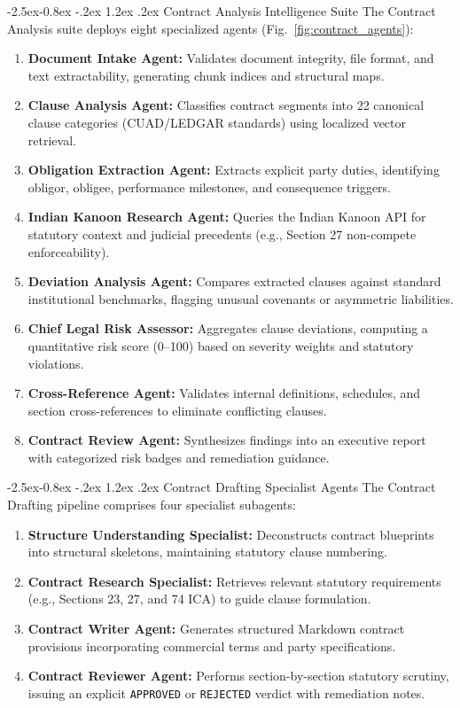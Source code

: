 \documentclass[3p,times,procedia]{elsarticle}
\makeatletter
\renewcommand\subsection{\@startsection{subsection}{2}{\z@}%
                                     {-2.5ex\@plus -0.8ex \@minus -.2ex}%
                                     {1.2ex \@plus .2ex}%
                                     {\fontsize{10}{12}\selectfont\itshape}}
\makeatother
\begin{document}
\subsection{Contract Analysis Intelligence Suite}
The Contract Analysis suite deploys eight specialized agents (Fig.~\ref{fig:contract_agents}):
\begin{enumerate}
\setlength{\itemsep}{0pt}\setlength{\parskip}{0pt}
\item \textbf{Document Intake Agent:} Validates document integrity, file format, and text extractability, generating chunk indices and structural maps.
\item \textbf{Clause Analysis Agent:} Classifies contract segments into 22 canonical clause categories (CUAD/LEDGAR standards) using localized vector retrieval.
\item \textbf{Obligation Extraction Agent:} Extracts explicit party duties, identifying obligor, obligee, performance milestones, and consequence triggers.
\item \textbf{Indian Kanoon Research Agent:} Queries the Indian Kanoon API for statutory context and judicial precedents (e.g., Section 27 non-compete enforceability).
\item \textbf{Deviation Analysis Agent:} Compares extracted clauses against standard institutional benchmarks, flagging unusual covenants or asymmetric liabilities.
\item \textbf{Chief Legal Risk Assessor:} Aggregates clause deviations, computing a quantitative risk score (0--100) based on severity weights and statutory violations.
\item \textbf{Cross-Reference Agent:} Validates internal definitions, schedules, and section cross-references to eliminate conflicting clauses.
\item \textbf{Contract Review Agent:} Synthesizes findings into an executive report with categorized risk badges and remediation guidance.
\end{enumerate}

\subsection{Contract Drafting Specialist Agents}
The Contract Drafting pipeline comprises four specialist subagents:
\begin{enumerate}
\setlength{\itemsep}{0pt}\setlength{\parskip}{0pt}
\item \textbf{Structure Understanding Specialist:} Deconstructs contract blueprints into structural skeletons, maintaining statutory clause numbering.
\item \textbf{Contract Research Specialist:} Retrieves relevant statutory requirements (e.g., Sections 23, 27, and 74 ICA) to guide clause formulation.
\item \textbf{Contract Writer Agent:} Generates structured Markdown contract provisions incorporating commercial terms and party specifications.
\item \textbf{Contract Reviewer Agent:} Performs section-by-section statutory scrutiny, issuing an explicit \texttt{APPROVED} or \texttt{REJECTED} verdict with remediation notes.
\end{enumerate}
\end{document}
